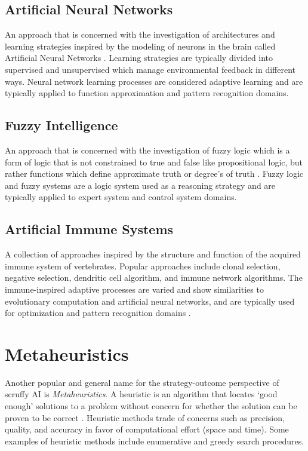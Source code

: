 \documentclass[a4paper, 11pt]{article}
\begin{document}
\subsection{Artificial Neural Networks}
An approach that is concerned with the investigation of architectures and learning strategies inspired by the modeling of neurons in the brain called Artificial Neural Networks \cite{Bishop1995}. Learning strategies are typically divided into supervised and unsupervised which manage environmental feedback in different ways. Neural network learning processes are considered adaptive learning and are typically applied to function approximation and pattern recognition domains.

\subsection{Fuzzy Intelligence}
An approach that is concerned with the investigation of fuzzy logic which is a form of logic that is not constrained to true and false like propositional logic, but rather functions which define approximate truth or degree’s of truth \cite{Zadeh1996}. Fuzzy logic and fuzzy systems are a logic system used as a reasoning strategy and are typically applied to expert system and control system domains.

\subsection{Artificial Immune Systems}
A collection of approaches inspired by the structure and function of the acquired immune system of vertebrates. Popular approaches include clonal selection, negative selection, dendritic cell algorithm, and immune network algorithms. The immune-inspired adaptive processes are varied and show similarities to evolutionary computation and artificial neural networks, and are typically used for optimization and pattern recognition domains \cite{Castro2002}.  

% 
% 
\section{Metaheuristics}
\label{sec:metaheuristics}
Another popular and general name for the strategy-outcome perspective of scruffy AI is \emph{Metaheuristics}. 
A heuristic is an algorithm that locates `good enough' solutions to a problem without concern for whether the solution can be proven to be correct \cite{Michalewicz2004}. Heuristic methods trade of concerns such as precision, quality, and accuracy in favor of computational effort (space and time). Some examples of heuristic methods include enumerative and greedy search procedures.
\end{document}
